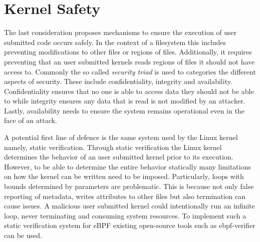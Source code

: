 

\section{Kernel Safety}

\label{safety}

The last consideration proposes mechanisms to ensure the execution of user
submitted code occurs safely. In the context of a filesystem this includes
preventing modifications to other files or regions of files. Additionally, it
requires preventing that an user submitted kernels reads regions of files it
should not have access to. Commonly the so called \textit{security triad} is
used to categories the different aspects of security. These
include confidentiality, integrity and availability. Confidentiality ensures
that no one is able to access data they should not be able to while integrity
ensures any data that is read is not modified by an attacker. Lastly,
availability needs to ensure the system remains operational even in the face of
an attack.

A potential first line of defence is the same system used by the Linux kernel
namely, static verification. Through static verification the Linux kernel
determines the behavior of an user submitted kernel prior to its execution.
However, to be able to determine the entire behavior statically many limitations
on how the kernel can be written need to be imposed. Particularly, loops with
bounds determined by parameters are problematic. This is because not only
false reporting of metadata, writes attributes to other files but also
termination can cause issues. A malicious user submitted kernel could
intentionally run an infinite loop, never terminating and consuming system
resources. To implement such a static verification system for eBPF existing
open-source tools such as ebpf-verifier \cite{ebpf-verifier} can be used.

